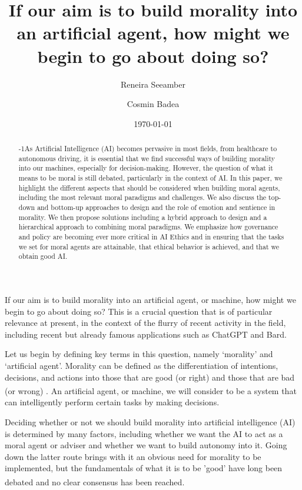 \documentclass[10pt]{article}
\title{If our aim is to build morality into an artificial agent, how might we begin to go about doing so?}
\author[1]{Reneira Seeamber}
\author[1]{Cosmin Badea}
\affil[1]{Department of Computing, Imperial College London, London, SW7 2BX, United Kingdom}
\date{\today}
\begin{document}
\maketitle

\begin{abstract}\looseness-1As Artificial Intelligence (AI) becomes pervasive in most fields, from healthcare to autonomous driving, it is essential that we find successful ways of building morality into our machines, especially for decision-making. However, the question of what it means to be moral is still debated, particularly in the context of AI. In this paper, we highlight the different aspects that should be considered when building moral agents, including the most relevant moral paradigms and challenges. We also discuss the top-down and bottom-up approaches to design and the role of emotion and sentience in morality. We then propose solutions including a hybrid approach to design and a hierarchical approach to combining moral paradigms. We emphasize how governance and policy are becoming ever more critical in AI Ethics and in ensuring that the tasks we set for moral agents are attainable, that ethical behavior is achieved, and that we obtain good AI.
\end{abstract}


If our aim is to build morality into an artificial agent, or machine, how might we begin to go about doing so? This is a crucial question that is of particular relevance at present, in the context of the flurry of recent activity in the field, including recent but already famous applications such as ChatGPT and Bard. 

Let us begin by defining key terms in this question, namely ‘morality’ and ‘artificial agent’. Morality can be defined as the differentiation of intentions, decisions, and actions into those that are good (or right) and those that are bad (or wrong) \textsuperscript{\cite{khatibi_morality_2016}}. An artificial agent, or machine, we will consider to be a system that can intelligently perform certain tasks by making decisions.


Deciding whether or not we should build morality into artificial intelligence (AI) is determined by many factors, including whether we want the AI to act as a moral agent or adviser and whether we want to build autonomy into it. Going down the latter route brings with it an obvious need for morality to be implemented, but the fundamentals of what it is to be 'good' have long been debated and no clear consensus has been reached\textsuperscript{\cite{badea_have_2022}}. 
\end{document}
